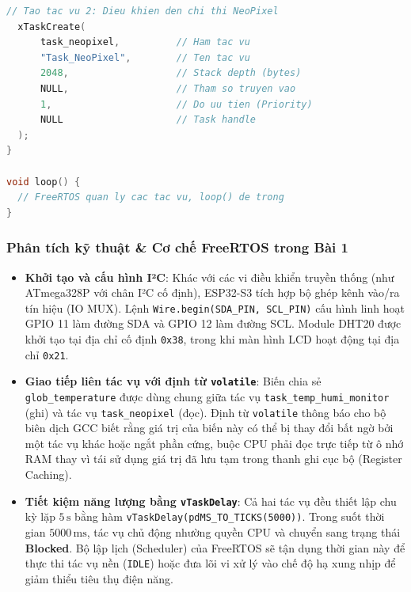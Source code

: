 \begin{lstlisting}[language=C++]
  // Tao tac vu 2: Dieu khien den chi thi NeoPixel
  xTaskCreate(
      task_neopixel,          // Ham tac vu
      "Task_NeoPixel",        // Ten tac vu
      2048,                   // Stack depth (bytes)
      NULL,                   // Tham so truyen vao
      1,                      // Do uu tien (Priority)
      NULL                    // Task handle
  );
}

void loop() {
  // FreeRTOS quan ly cac tac vu, loop() de trong
}

\end{lstlisting}

\subsubsection{Phân tích kỹ thuật \& Cơ chế FreeRTOS trong Bài 1}
\begin{itemize}[leftmargin=*]
    \item \textbf{Khởi tạo và cấu hình I²C}: Khác với các vi điều khiển truyền thống (như ATmega328P với chân I²C cố định), ESP32-S3 tích hợp bộ ghép kênh vào/ra tín hiệu (IO MUX). Lệnh \texttt{Wire.begin(SDA\_PIN, SCL\_PIN)} cấu hình linh hoạt GPIO 11 làm đường SDA và GPIO 12 làm đường SCL. Module DHT20 được khởi tạo tại địa chỉ cố định \texttt{0x38}, trong khi màn hình LCD hoạt động tại địa chỉ \texttt{0x21}.
    \item \textbf{Giao tiếp liên tác vụ với định từ \texttt{volatile}}: Biến chia sẻ \texttt{glob\_temperature} được dùng chung giữa tác vụ \texttt{task\_temp\_humi\_monitor} (ghi) và tác vụ \texttt{task\_neopixel} (đọc). Định từ \texttt{volatile} thông báo cho bộ biên dịch GCC biết rằng giá trị của biến này có thể bị thay đổi bất ngờ bởi một tác vụ khác hoặc ngắt phần cứng, buộc CPU phải đọc trực tiếp từ ô nhớ RAM thay vì tái sử dụng giá trị đã lưu tạm trong thanh ghi cục bộ (Register Caching).
    \item \textbf{Tiết kiệm năng lượng bằng \texttt{vTaskDelay}}: Cả hai tác vụ đều thiết lập chu kỳ lặp $5\,\text{s}$ bằng hàm \texttt{vTaskDelay(pdMS\_TO\_TICKS(5000))}. Trong suốt thời gian $5000\,\text{ms}$, tác vụ chủ động nhường quyền CPU và chuyển sang trạng thái \textbf{Blocked}. Bộ lập lịch (Scheduler) của FreeRTOS sẽ tận dụng thời gian này để thực thi tác vụ nền (\texttt{IDLE}) hoặc đưa lõi vi xử lý vào chế độ hạ xung nhịp để giảm thiểu tiêu thụ điện năng.
\end{itemize}

\newpage
